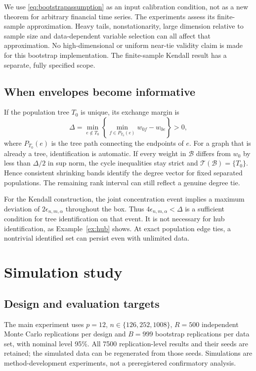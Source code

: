 \documentclass[pdflatex,sn-mathphys-ay]{sn-jnl}
\theoremstyle{thmstyleone}
\theoremstyle{thmstyletwo}
\newcommand{\T}{\mathcal T}
\newcommand{\B}{\mathcal B}
\begin{document}
We use \eqref{eq:bootstrapassumption} as an input calibration condition, not as a new theorem for arbitrary financial time series. The experiments assess its finite-sample approximation. Heavy tails, nonstationarity, large dimension relative to sample size and data-dependent variable selection can all affect that approximation. No high-dimensional or uniform near-tie validity claim is made for this bootstrap implementation. The finite-sample Kendall result has a separate, fully specified scope.

\subsection{When envelopes become informative}
If the population tree $T_0$ is unique, its exchange margin is
\begin{equation}\label{eq:margin}
 \Delta=\min_{e\notin T_0}\left\{\min_{f\in P_{T_0}(e)}w_{0f}-w_{0e}\right\}>0,
\end{equation}
where $P_{T_0}(e)$ is the tree path connecting the endpoints of $e$. For a graph that is already a tree, identification is automatic. If every weight in $\B$ differs from $w_0$ by less than $\Delta/2$ in sup norm, the cycle inequalities stay strict and $\T(\B)=\{T_0\}$. Hence consistent shrinking bands identify the degree vector for fixed separated populations. The remaining rank interval can still reflect a genuine degree tie.

For the Kendall construction, the joint concentration event implies a maximum deviation of $2\epsilon_{n,m,\alpha}$ throughout the box. Thus $4\epsilon_{n,m,\alpha}<\Delta$ is a sufficient condition for tree identification on that event. It is not necessary for hub identification, as Example~\ref{ex:hub} shows. At exact population edge ties, a nontrivial identified set can persist even with unlimited data.

\section{Simulation study}\label{sec:simulation}
\subsection{Design and evaluation targets}
The main experiment uses $p=12$, $n\in\{126,252,1008\}$, $R=500$ independent Monte Carlo replications per design and $B=999$ bootstrap replications per data set, with nominal level 95\%. All 7500 replication-level results and their seeds are retained; the simulated data can be regenerated from those seeds. Simulations are method-development experiments, not a preregistered confirmatory analysis.
\end{document}
